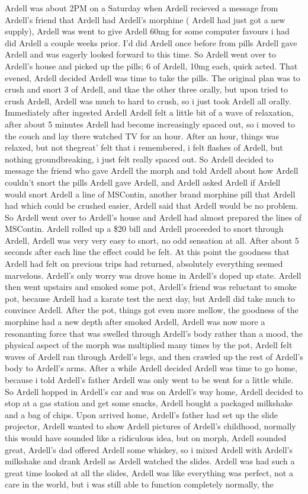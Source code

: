 \documentclass[12pt]{book}
\begin{document}
Ardell was about 2PM on a Saturday when Ardell recieved a message from Ardell's friend that Ardell had Ardell's morphine ( Ardell had just got a new supply), Ardell was went to give Ardell 60mg for some computer favours i had did Ardell a couple weeks prior. I'd did Ardell once before from pills Ardell gave Ardell and was eagerly looked forward to this time. So Ardell went over to Ardell's house and picked up the pills; 6 of Ardell, 10mg each, quick acted. That evened, Ardell decided Ardell was time to take the pills. The original plan was to crush and snort 3 of Ardell, and tkae the other three orally, but upon tried to crush Ardell, Ardell was much to hard to crush, so i just took Ardell all orally. Immediately after ingested Ardell Ardell felt a little bit of a wave of relaxation, after about 5 minutes Ardell had become increasingly spaced out, so i moved to the couch and lay there watched TV for an hour. After an hour, things was relaxed, but not thegreat' felt that i remembered, i felt flashes of Ardell, but nothing groundbreaking, i just felt really spaced out. So Ardell decided to message the friend who gave Ardell the morph and told Ardell about how Ardell couldn't snort the pills Ardell gave Ardell, and Ardell asked Ardell if Ardell would snort Ardell a line of MSContin, another brand morphine pill that Ardell had which could be crushed easier, Ardell said that Ardell would be no problem. So Ardell went over to Ardell's house and Ardell had almost prepared the lines of MSContin. Ardell rolled up a \$20 bill and Ardell proceeded to snort through Ardell, Ardell was very very easy to snort, no odd sensation at all. After about 5 seconds after each line the effect could be felt. At this point the goodness that Ardell had felt on previous trips had returned, absolutely everything seemed marvelous. Ardell's only worry was drove home in Ardell's doped up state. Ardell then went upstairs and smoked some pot, Ardell's friend was reluctant to smoke pot, because Ardell had a karate test the next day, but Ardell did take much to convince Ardell. After the pot, things got even more mellow, the goodness of the morphine had a new depth after smoked Ardell, Ardell was now more a resonanting force that was swelled through Ardell's body rather than a mood, the physical aspect of the morph was multiplied many times by the pot, Ardell felt waves of Ardell ran through Ardell's legs, and then crawled up the rest of Ardell's body to Ardell's arms. After a while Ardell decided Ardell was time to go home, because i told Ardell's father Ardell was only went to be went for a little while. So Ardell hopped in Ardell's car and was on Ardell's way home, Ardell decided to stop at a gas station and get some snacks, Ardell bought a packaged milkshake and a bag of chips. Upon arrived home, Ardell's father had set up the slide projector, Ardell wanted to show Ardell pictures of Ardell's childhood, normally this would have sounded like a ridiculous idea, but on morph, Ardell sounded great, Ardell's dad offered Ardell some whiskey, so i mixed Ardell with Ardell's milkshake and drank Ardell as Ardell watched the slides. Ardell was had such a great time looked at all the slides, Ardell was like everything was perfect, not a care in the world, but i was still able to function completely normally, the 
\end{document}
